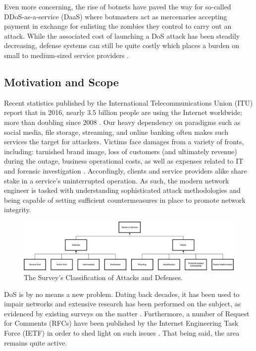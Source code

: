 \documentclass[conference]{IEEEtran}
\begin{document}
Even more concerning, the rise of botnets have paved the way for so-called DDoS-as-a-service (DaaS) where botmasters act as mercenaries accepting payment in exchange for enlisting the zombies they control to carry out an attack. While the associated cost of launching a DoS attack has been steadily decreasing, defense systems can still be quite costly which places a burden on small to medium-sized service providers \cite{Wood:DoSE}.

\subsection{Motivation and Scope}
Recent statistics published by the International Telecommunications Union (ITU) report that in 2016, nearly 3.5 billion people are using the Internet worldwide; more than doubling since 2008 \cite{ICTStats}. Our heavy dependency on paradigms such as social media, file storage, streaming, and online banking often makes such services the target for attackers. Victims face damages from a variety of fronts, including: tarnished brand image, loss of customers (and ultimately revenue) during the outage, business operational costs, as well as expenses related to IT and forensic investigation \cite{Arbor:WISR}. Accordingly, clients and service providers alike share stake in a service's uninterrupted operation. As such, the modern network engineer is tasked with understanding sophisticated attack methodologies and being capable of setting sufficient countermeasures in place to promote network integrity.

\begin{figure}[!t]
\centering
\includegraphics[width=7in]{myDiagramBig}
\caption{The Survey's Classification of Attacks and Defenses.}
\label{fig_struct}
\end{figure}

DoS is by no means a new problem. Dating back decades, it has been used to impair networks and extensive research has been performed on the subject, as evidenced by existing surveys on the matter \cite{SecuringCloudServers:Chapade,DoSTCPAnalysis:Schuba,Yan:SDNSurvey}. Furthermore, a number of Request for Comments (RFCs) have been published by the Internet Engineering Task Force (IETF) in order to shed light on such issues \cite{rfc1948,rfc6528}. That being said, the area remains quite active.
\end{document}
